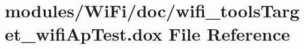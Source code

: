 \hypertarget{wifi__tools_target__wifi_ap_test_8dox}{}\section{modules/\+Wi\+Fi/doc/wifi\+\_\+tools\+Target\+\_\+wifi\+Ap\+Test.dox File Reference}
\label{wifi__tools_target__wifi_ap_test_8dox}
